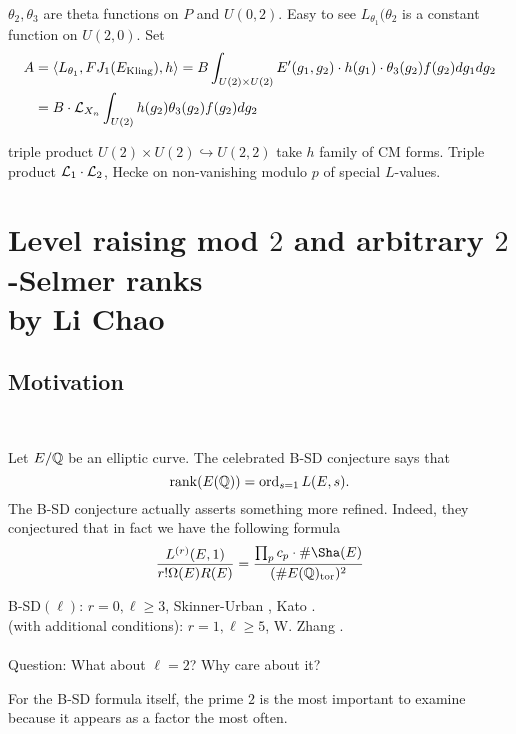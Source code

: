 \documentclass[12pt,amsfont]{amsart}
\begin{document}
$\theta_2, \theta_3$ are theta functions on $P$ and $U(0,2)$. Easy to see $L_{\theta_1}(\theta_2$ is a constant function on $U(2,0)$. Set 
\begin{align*} A & = \langle L_{\theta_1}, FJ_1(E_{\text{Kling}}), h \rangle = B \int_{U(2) \times U(2)} E'(g_1, g_2) \cdot h(g_1) \cdot \theta_3(g_2) f(g_2) dg_1 dg_2 \\
& = B \cdot \mathcal{L}_{X_n} \int_{U(2)} h(g_2) \theta_3(g_2) f(g_2) d g_2 \end{align*}

triple product $U(2) \times U(2) \hookrightarrow U(2,2)$ take $h$ family of CM forms. Triple product $\mathcal{L}_1 \cdot \mathcal{L}_2$, Hecke on non-vanishing modulo $p$ of special $L$-values. 

\renewcommand{\thesubsection}{\arabic{section}.R}
\begingroup
\renewcommand{\addcontentsline}[3]{}%
\endgroup

\newpage
\section{Level raising mod $2$ and arbitrary $2$-Selmer ranks\\ by Li Chao}\label{15}
\renewcommand{\thesubsection}{\arabic{section}.\arabic{subsection}}

\subsection{Motivation}
{\ }

Let $E/{\mathbb Q}$ be an elliptic curve. The celebrated B-SD conjecture says that 
\[\operatorname{rank}(E({\mathbb Q})) = \operatorname{ord}_{s=1} L(E,s).\]
The B-SD conjecture actually asserts something more refined. Indeed, they conjectured that in fact we have the following formula
\[ \frac{L^{(r)}(E,1)}{r! \Omega(E) R(E)} = \frac{ \prod_p c_p \cdot \# \Sha(E) }{(\# E(\bQ)_{\text{tor}})^2 }\]

B-SD$(\ell)$: $r = 0, \ell \geq 3$, Skinner-Urban , Kato . \\
(with additional conditions): $r = 1, \ell \geq 5$, W. Zhang . \\ \\
Question: What about $\ell = 2$? Why care about it?

\begin{rmk} For the B-SD formula itself, the prime $2$ is the most important to examine because it appears as a factor the most often.
\end{rmk}
\end{document}
